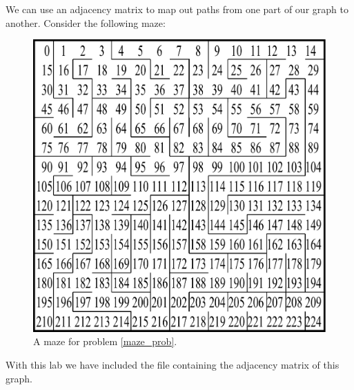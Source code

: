 We can use an adjacency matrix to map out paths from one part of our graph to another.
Consider the following maze:

\begin{figure}
\includegraphics[width=.8\textwidth]{maze.pdf}
\caption{A maze for problem \ref{maze_prob}.}
\label{maze_fig}
\end{figure}

With this lab we have included the file  containing the adjacency matrix of this graph.

